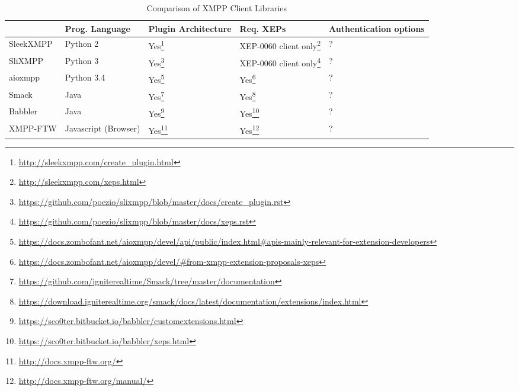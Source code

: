 \begin{sidewaystable}
    \centering
    \caption{Comparison of XMPP Client Libraries}
    \label{tbl:language-comparison-ds}
    \begin{tabu}{X|X X X X}
        \hline
        & Prog. Language
        & Plugin Architecture
        & Req. XEPs
        & Authentication options
        \\ \hline

        SleekXMPP
        & Python 2
        & Yes\footnote{\url{http://sleekxmpp.com/create_plugin.html}}
        & XEP-0060 client only\footnote{\url{http://sleekxmpp.com/xeps.html}}
        & ?
        \\

        SliXMPP
        & Python 3
        & Yes\footnote{\url{https://github.com/poezio/slixmpp/blob/master/docs/create_plugin.rst}}
        & XEP-0060 client only\footnote{\url{https://github.com/poezio/slixmpp/blob/master/docs/xeps.rst}}
        & ?
        \\

        aioxmpp
        & Python 3.4
        & Yes\footnote{\url{https://docs.zombofant.net/aioxmpp/devel/api/public/index.html\#apis-mainly-relevant-for-extension-developers}}
        & Yes\footnote{\url{https://docs.zombofant.net/aioxmpp/devel/\#from-xmpp-extension-proposals-xeps}}
        & ?
        \\

        Smack
        & Java
        & Yes\footnote{\url{https://github.com/igniterealtime/Smack/tree/master/documentation}}
        & Yes\footnote{\url{https://download.igniterealtime.org/smack/docs/latest/documentation/extensions/index.html}}
        & ?
        \\

        Babbler
        & Java
        & Yes\footnote{\url{https://sco0ter.bitbucket.io/babbler/customextensions.html}}
        & Yes\footnote{\url{https://sco0ter.bitbucket.io/babbler/xeps.html}}
        & ?
        \\

        XMPP-FTW
        & Javascript (Browser)
        & Yes\footnote{\url{http://docs.xmpp-ftw.org/}}
        & Yes\footnote{\url{http://docs.xmpp-ftw.org/manual/}}
        & ?
        \\
    \end{tabu}
\end{sidewaystable}
